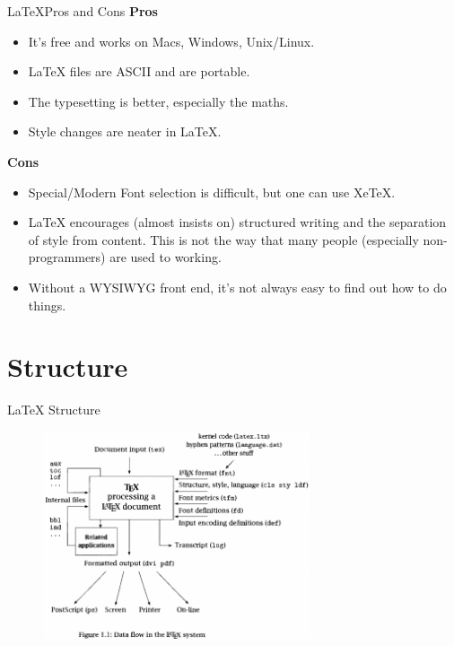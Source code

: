 \documentclass[10pt,times]{beamer}
\begin{document}
\begin{frame}{\LaTeX Pros and Cons}
\textbf{Pros}
\begin{itemize}
\item    It's free and works on Macs, Windows, Unix/Linux.
\item    LaTeX files are ASCII and are portable.
\item    The typesetting is better, especially the maths.
\item    Style changes are neater in LaTeX. 
\end{itemize}
\textbf{Cons}
\begin{itemize}
\item    Special/Modern Font selection is difficult, but one can use XeTeX.
\item    LaTeX encourages (almost insists on) structured writing and the 
separation of style from content. This is not the way that many people 
(especially non-programmers) are used to working.
\item    Without a WYSIWYG front end, it's not always easy to find out how to 
do things.
\end{itemize}
\end{frame}



\section{Structure}


\begin{frame}{LaTeX Structure}
\begin{figure}
\centering
\includegraphics[width=0.7\textwidth]{figs/LaTeX.png}
\end{figure}
\end{frame}
\end{document}
